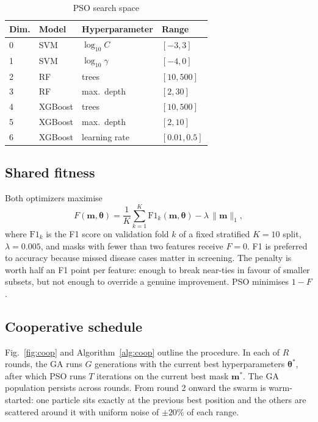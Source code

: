 \documentclass[conference]{IEEEtran}
\begin{document}
\begin{table}[t]
\caption{PSO search space}
\label{tab:bounds}
\centering
\begin{tabular}{@{}llll@{}}
\toprule
Dim. & Model & Hyperparameter & Range \\ \midrule
0 & SVM & $\log_{10} C$ & $[-3, 3]$ \\
1 & SVM & $\log_{10}\gamma$ & $[-4, 0]$ \\
2 & RF & trees & $[10, 500]$ \\
3 & RF & max.\ depth & $[2, 30]$ \\
4 & XGBoost & trees & $[10, 500]$ \\
5 & XGBoost & max.\ depth & $[2, 10]$ \\
6 & XGBoost & learning rate & $[0.01, 0.5]$ \\ \bottomrule
\end{tabular}
\end{table}

\subsection{Shared fitness}
Both optimizers maximise
\begin{equation}
F(\mathbf{m},\boldsymbol{\theta}) = \frac{1}{K}\sum_{k=1}^{K}\mathrm{F1}_k(\mathbf{m},\boldsymbol{\theta}) - \lambda\,\lVert\mathbf{m}\rVert_1,
\label{eq:fit}
\end{equation}
where $\mathrm{F1}_k$ is the F1 score on validation fold $k$ of a fixed stratified $K=10$ split, $\lambda=0.005$, and masks with fewer than two features receive $F=0$. F1 is preferred to accuracy because missed disease cases matter in screening. The penalty is worth half an F1 point per feature: enough to break near-ties in favour of smaller subsets, but not enough to override a genuine improvement. PSO minimises $1-F$.

\subsection{Cooperative schedule}
Fig.~\ref{fig:coop} and Algorithm~\ref{alg:coop} outline the procedure. In each of $R$ rounds, the GA runs $G$ generations with the current best hyperparameters $\boldsymbol{\theta}^{*}$, after which PSO runs $T$ iterations on the current best mask $\mathbf{m}^{*}$. The GA population persists across rounds. From round 2 onward the swarm is warm-started: one particle sits exactly at the previous best position and the others are scattered around it with uniform noise of $\pm20\%$ of each range.
\end{document}
